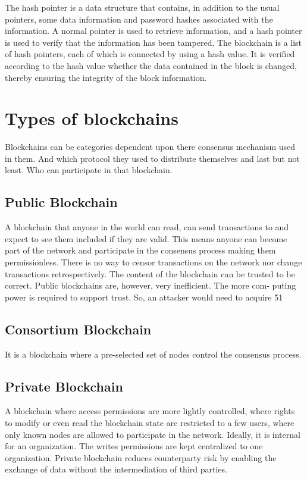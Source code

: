 \documentclass[BTech]{srmuthesis}
\begin{document}
 The hash pointer is a data structure that contains, in addition to the usual pointers, some data information and password hashes associated with the information. A normal pointer is used to retrieve information, and a hash pointer is used to verify that the information has been tampered. The blockchain is a list of hash pointers, each of which is connected by using a hash value. It is verified according to the hash value whether the data contained in the block is changed, thereby ensuring the integrity of the block information.

 \section{Types of blockchains}
 Blockchains can be categories dependent upon there consensus mechanism used in them. And which protocol they used to distribute themselves and last but not least. Who can participate in that blockchain.

 \subsection{Public Blockchain}
 A blockchain that anyone in the world can read, can send transactions to and expect to see them included if they are valid. This means anyone can become part of the network and participate in the consensus process making them permissionless. There is no way to censor transactions on the network nor change transactions retrospectively. The content of the blockchain can be trusted to be correct. Public blockchains are, however, very inefficient. The more com- puting power is required to support trust. So, an attacker would need to acquire 51%

 \subsection{Consortium Blockchain}
 It is a blockchain where a pre-selected set of nodes control the consensus process.

 \subsection{Private Blockchain}
 A blockchain where access permissions are more lightly controlled, where rights to modify or even read the blockchain state are restricted to a few users, where only known nodes are allowed to participate in the network. Ideally, it is internal for an organization. The writes permissions are kept centralized to one organization. Private blockchain reduces counterparty risk by enabling the exchange of data without the intermediation of third parties.
\end{document}

